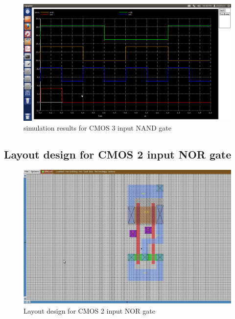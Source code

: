 \documentclass[12pt,a4paper]{article}
\begin{document}
\begin{center}
\vspace{10pt}
\begin{figure}[h]
\centering
\includegraphics[scale=.3]{3ipandsm.png}
\caption[Short]{simulation results for CMOS 3 input NAND gate }
\end{figure}

\clearpage



\subsection{Layout design for CMOS 2 input NOR gate}
\vspace{5pt}
\begin{figure}[h]
\centering
\includegraphics[scale=.3]{nor1.jpg}
\caption[Short]{Layout design for CMOS 2 input NOR gate}
\end{figure}


\end{center}
\end{document}
